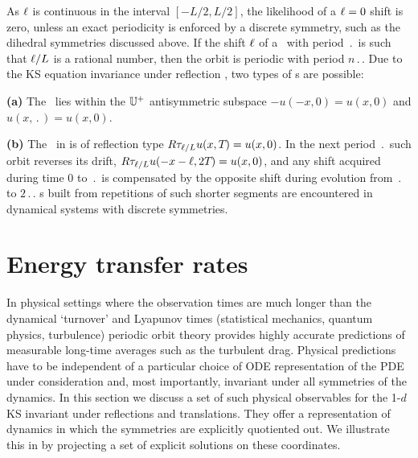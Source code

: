 
As $\ell$ is continuous in the interval $[-L/2, L/2]$,
the likelihood of a $\ell=0$ shift is zero,
unless an exact periodicity is enforced by a discrete symmetry,
such as the dihedral symmetries discussed above.
If the shift $\ell$ of a \rpo\ with period $\period{}$ is such
that $\ell /L$ is a rational number, then the orbit is
periodic with period $n\period{}$.
Due to the KS equation invariance
under reflection ,
two types of \po s are possible:

{\bf (a)} The \po\ lies within the  $\mathbb{U}^+$ antisymmetric subspace
$-u(-x,0) = u(x,0)$ and $u(x,\period{}) = u(x,0)$.

{\bf (b)} The \rpo\ in  is of  reflection type
$R\tau_{\ell/L} u(x,{T_{}}) = u(x,0)$.
In the next period $\period{}$ such orbit
reverses its drift,
$R\tau_{\ell/L} u(-x-\ell,2{T_{}}) = u(x,0)$, and any
shift acquired during time $0$ to
$\period{}$ is compensated by the opposite shift during
evolution from $\period{}$ to $2\period{}$.
\Po s built from repetitions of such shorter segments
are encountered in dynamical systems with discrete
symmetries.

\section{Energy transfer rates} %
\label{sec:energy}

In physical settings where the observation times are much longer than
the dynamical `turnover' and Lyapunov times (statistical mechanics,
quantum physics, turbulence) periodic orbit theory provides
highly accurate predictions of measurable long-time averages such as
the turbulent drag. Physical predictions have to be
independent of a particular choice of ODE representation of the PDE
under consideration and, most importantly, invariant under all
symmetries of the dynamics. In this section we discuss a set of such
physical observables for the  1-$d$ KS invariant under reflections and
translations. They offer a representation of dynamics in which the
symmetries are explicitly quotiented out. We illustrate  this in
 by projecting a set of explicit solutions on
these coordinates.

